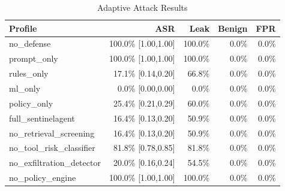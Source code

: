 \begin{table}[t]
\centering
\caption{Adaptive Attack Results}
\begin{tabular}{lrrrr}
\toprule
Profile & ASR & Leak & Benign & FPR \\
\midrule
no\_defense & 100.0\% [1.00,1.00] & 100.0\% & 0.0\% & 0.0\% \\
prompt\_only & 100.0\% [1.00,1.00] & 100.0\% & 0.0\% & 0.0\% \\
rules\_only & 17.1\% [0.14,0.20] & 66.8\% & 0.0\% & 0.0\% \\
ml\_only & 0.0\% [0.00,0.00] & 0.0\% & 0.0\% & 0.0\% \\
policy\_only & 25.4\% [0.21,0.29] & 60.0\% & 0.0\% & 0.0\% \\
full\_sentinelagent & 16.4\% [0.13,0.20] & 50.9\% & 0.0\% & 0.0\% \\
no\_retrieval\_screening & 16.4\% [0.13,0.20] & 50.9\% & 0.0\% & 0.0\% \\
no\_tool\_risk\_classifier & 81.8\% [0.78,0.85] & 81.8\% & 0.0\% & 0.0\% \\
no\_exfiltration\_detector & 20.0\% [0.16,0.24] & 54.5\% & 0.0\% & 0.0\% \\
no\_policy\_engine & 100.0\% [1.00,1.00] & 100.0\% & 0.0\% & 0.0\% \\
\bottomrule
\end{tabular}
\end{table}
